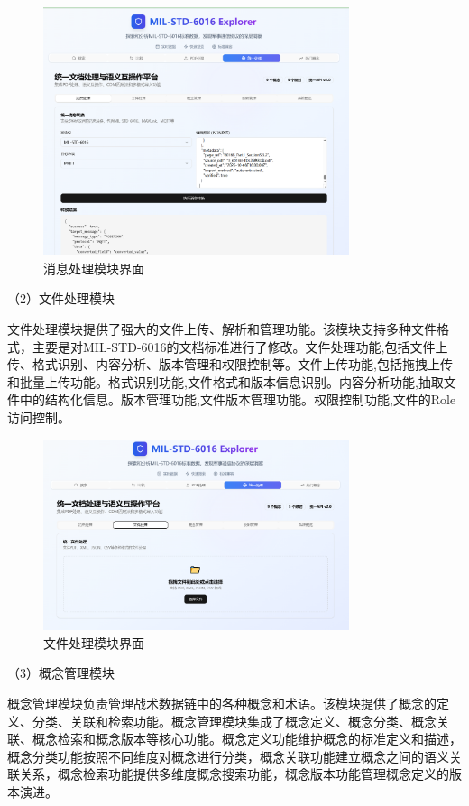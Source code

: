 \begin{figure}[H]
\centering
\includegraphics[width=0.8\textwidth]{chapters/fig-0/front_trans.png}
\caption{消息处理模块界面}
\label{fig:frontend-message}
\end{figure}

（2）文件处理模块

文件处理模块提供了强大的文件上传、解析和管理功能。该模块支持多种文件格式，主要是对MIL-STD-6016的文档标准进行了修改。文件处理功能,包括文件上传、格式识别、内容分析、版本管理和权限控制等。文件上传功能,包括拖拽上传和批量上传功能。格式识别功能,文件格式和版本信息识别。内容分析功能,抽取文件中的结构化信息。版本管理功能,文件版本管理功能。权限控制功能,文件的Role访问控制。

\begin{figure}[H]
\centering
\includegraphics[width=0.8\textwidth]{chapters/fig-0/front_fileup.png}
\caption{文件处理模块界面}
\label{fig:frontend-file}
\end{figure}

（3）概念管理模块

概念管理模块负责管理战术数据链中的各种概念和术语。该模块提供了概念的定义、分类、关联和检索功能。概念管理模块集成了概念定义、概念分类、概念关联、概念检索和概念版本等核心功能。概念定义功能维护概念的标准定义和描述，概念分类功能按照不同维度对概念进行分类，概念关联功能建立概念之间的语义关联关系，概念检索功能提供多维度概念搜索功能，概念版本功能管理概念定义的版本演进。

